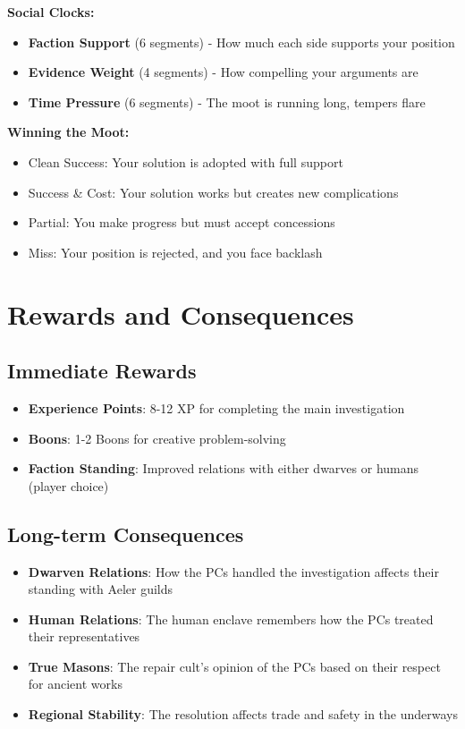 \documentclass[11pt]{article}
\begin{document}
\textbf{Social Clocks:}
\begin{itemize}
\item \textbf{Faction Support} (6 segments) - How much each side supports your position
\item \textbf{Evidence Weight} (4 segments) - How compelling your arguments are
\item \textbf{Time Pressure} (6 segments) - The moot is running long, tempers flare
\end{itemize}

\textbf{Winning the Moot:}
\begin{itemize}
\item Clean Success: Your solution is adopted with full support
\item Success \& Cost: Your solution works but creates new complications
\item Partial: You make progress but must accept concessions
\item Miss: Your position is rejected, and you face backlash
\end{itemize}

\section{Rewards and Consequences}

\subsection{Immediate Rewards}

\begin{itemize}
\item \textbf{Experience Points}: 8-12 XP for completing the main investigation
\item \textbf{Boons}: 1-2 Boons for creative problem-solving
\item \textbf{Faction Standing}: Improved relations with either dwarves or humans (player choice)
\end{itemize}

\subsection{Long-term Consequences}

\begin{itemize}
\item \textbf{Dwarven Relations}: How the PCs handled the investigation affects their standing with Aeler guilds
\item \textbf{Human Relations}: The human enclave remembers how the PCs treated their representatives
\item \textbf{True Masons}: The repair cult's opinion of the PCs based on their respect for ancient works
\item \textbf{Regional Stability}: The resolution affects trade and safety in the underways
\end{itemize}
\end{document}
